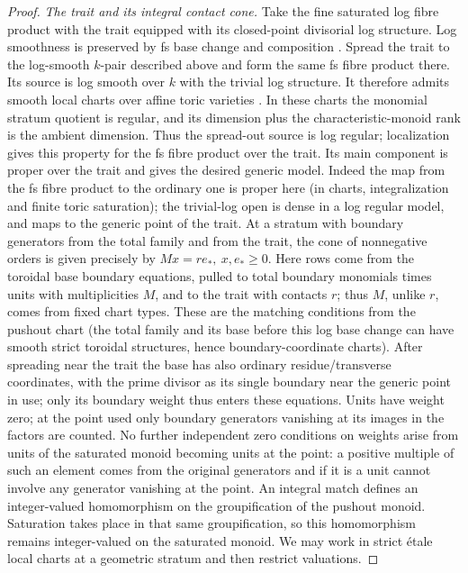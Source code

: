 \begin{proof}
\emph{The trait and its integral contact cone.}
Take the fine saturated log fibre product with the trait equipped with
its closed-point divisorial log structure.  Log smoothness is preserved
by fs base change and composition \cite[Section~1.1]{IllusieNakayamaTsuji}.
Spread the trait to the log-smooth $k$-pair described above and form the
same fs fibre product there.  Its source is log smooth over $k$ with
the trivial log structure.  It therefore admits smooth local charts
over affine toric varieties
\cite[Theorem~4.7 and Section~7]{FumiharuKatoLog}.
In these charts the monomial stratum quotient is regular, and its
dimension plus the characteristic-monoid rank is the ambient dimension.
Thus the spread-out source is log regular; localization gives this
property for the fs fibre product over the trait.
Its main component is proper over the trait and gives the desired generic model.
Indeed the map from the fs fibre product to the ordinary one is proper here (in charts, integralization and finite toric saturation); the trivial-log open is dense in a log regular model, and maps to the generic point of the trait.
At a stratum with boundary generators from the total family and from the trait, the cone of nonnegative orders is given precisely by \(Mx=r e_*,\ x,e_*\ge0\).
Here rows come from the toroidal base boundary equations, pulled to total boundary monomials times units with multiplicities \(M\), and to the trait with contacts \(r\); thus \(M\), unlike \(r\), comes from fixed chart types.
These are the matching conditions from the pushout chart (the total family and its base before this log base change can have smooth strict toroidal structures, hence boundary-coordinate charts).
After spreading near the trait the base has also ordinary residue/transverse coordinates, with the prime divisor as its single boundary near the generic point in use; only its boundary weight thus enters these equations.
Units have weight zero; at the point used only boundary generators vanishing at its images in the factors are counted.
No further independent zero conditions on weights arise from units of the saturated monoid becoming units at the point: a positive multiple of such an element comes from the original generators and if it is a unit cannot involve any generator vanishing at the point.
An integral match defines an integer-valued homomorphism on the
groupification of the pushout monoid.  Saturation takes place in that
same groupification, so this homomorphism remains integer-valued on
the saturated monoid.
We may work in strict \'etale local charts at a geometric stratum and then restrict valuations.

\end{proof}
